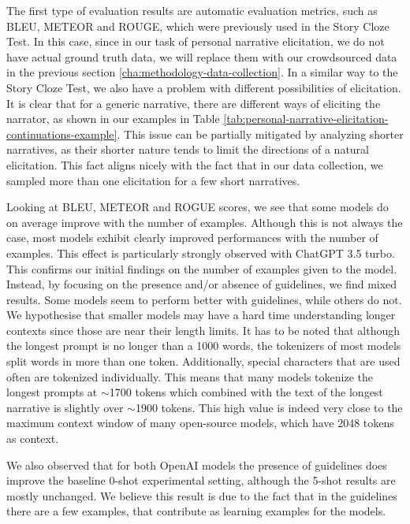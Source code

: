 
The first type of evaluation results are automatic evaluation metrics, such as BLEU, METEOR and ROUGE, which were previously used in the Story Cloze Test. In this case, since in our task of personal narrative elicitation, we do not have actual ground truth data, we will replace them with our crowdsourced data in the previous section \ref{cha:methodology-data-collection}. In a similar way to the Story Cloze Test, we also have a problem with different possibilities of elicitation. It is clear that for a generic narrative, there are different ways of eliciting the narrator, as shown in our examples in Table \ref{tab:personal-narrative-elicitation-continuations-example}. This issue can be partially mitigated by analyzing shorter narratives, as their shorter nature tends to limit the directions of a natural elicitation. This fact aligns nicely with the fact that in our data collection, we sampled more than one elicitation for a few short narratives. 





Looking at BLEU, METEOR and ROGUE scores, we see that some models do on average improve with the number of examples. Although this is not always the case, most models exhibit clearly improved performances with the number of examples. This effect is particularly strongly observed with ChatGPT 3.5 turbo. This confirms our initial findings on the number of examples given to the model.
Instead, by focusing on the presence and/or absence of guidelines, we find mixed results. Some models seem to perform better with guidelines, while others do not. We hypothesise that smaller models may have a hard time understanding longer contexts since those are near their length limits. It has to be noted that although the longest prompt is no longer than a 1000 words, the tokenizers of most models split words in more than one token. Additionally, special characters that are used often are tokenized individually. This means that many models tokenize the longest prompts at $\sim$1700 tokens which combined with the text of the longest narrative is slightly over $\sim$1900 tokens. This high value is indeed very close to the maximum context window of many open-source models, which have 2048 tokens as context.

We also observed that for both OpenAI models the presence of guidelines does improve the baseline 0-shot experimental setting, although the 5-shot results are mostly unchanged. We believe this result is due to the fact that in the guidelines there are a few examples, that contribute as learning examples for the models.  

